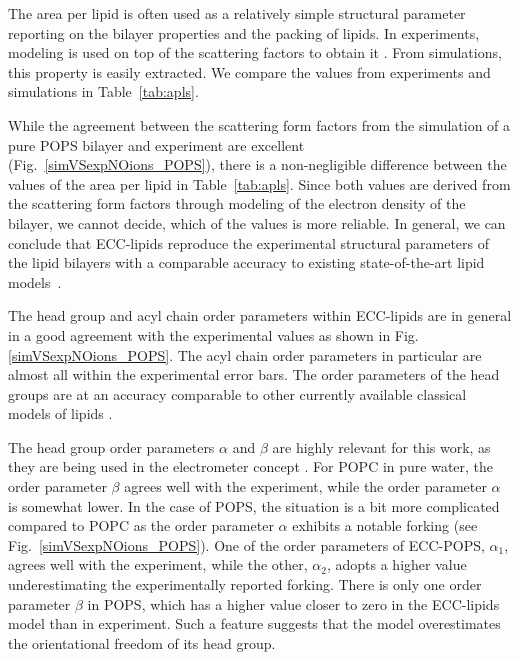 \documentclass[journal=jpcbfk,manuscript=article]{achemso}
\begin{document}
The area per lipid is often used as a relatively simple structural parameter reporting on the bilayer properties and the packing of lipids. 
In experiments, modeling is used on top of the scattering factors to obtain it \citep{kucerka14}. 
From simulations, this property is easily extracted. 
We compare the values from experiments and simulations in Table~\ref{tab:apls}. 


While the agreement between the scattering form factors 
from the simulation of a pure POPS bilayer and experiment 
are excellent (Fig.~\ref{simVSexpNOions_POPS}),
there is a non-negligible difference between the values of the area per lipid in Table~\ref{tab:apls}. 
Since both values are derived from the scattering form factors through modeling of the electron density of the bilayer,
we cannot decide, which of the values is more reliable. 
In general, we can conclude that ECC-lipids
reproduce the experimental structural parameters of the lipid bilayers 
with a comparable accuracy to existing state-of-the-art lipid models~\citep{botan15, ollila16, Pluhackova2016}. 
 
The head group and acyl chain order parameters within ECC-lipids
are in general in a good agreement with the experimental values 
as shown in Fig. \ref{simVSexpNOions_POPS}. 
The acyl chain order parameters in particular are almost all within the experimental error bars.
The order parameters of the head groups are at an accuracy comparable to 
other currently available classical models of lipids \citep{botan15, catte16, Pluhackova2016}. 

The head group order parameters $\alpha$ and $\beta$ are highly relevant for this work,
as they are being used in the electrometer concept \cite{altenbach84, catte16, melcr18}.
For POPC in pure water, the order parameter $\beta$ agrees well with the experiment, 
while the order parameter $\alpha$ is somewhat lower. 
In the case of POPS, the situation is a bit more complicated
compared to POPC as the order parameter $\alpha$ exhibits a notable forking (see Fig.~\ref{simVSexpNOions_POPS}).
One of the order parameters of ECC-POPS, $\alpha_1$, agrees well with the experiment, 
while the other, $\alpha_2$, adopts a higher value underestimating the experimentally reported forking. 
There is only one order parameter $\beta$ in POPS, 
which has a higher value closer to zero in the ECC-lipids model than in experiment. 
Such a feature suggests that the model overestimates the orientational freedom of its head group. 
\end{document}
